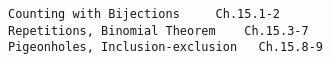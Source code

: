 \documentclass[handout]{mcs}
\begin{document}
\renewcommand{\reading}{
\begin{itemize}
\item Chapter 15{.\ \emph{Cardinality Rules}}

 \end{itemize}}


\begin{staffnotes}
\begin{verbatim}
Counting with Bijections     Ch.15.1-2
Repetitions, Binomial Theorem    Ch.15.3-7
Pigeonholes, Inclusion-exclusion   Ch.15.8-9              
\end{verbatim}
\end{staffnotes}







\end{document}

